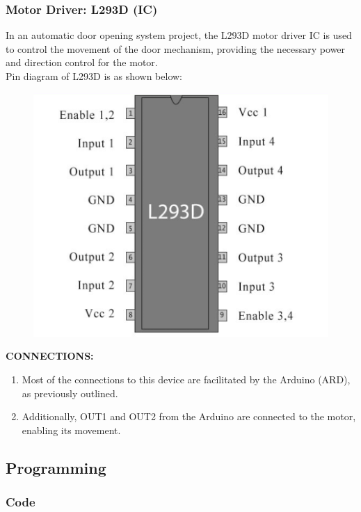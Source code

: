 \documentclass{article}
\begin{document}
\subsubsection{Motor Driver: L293D (IC)}
In an automatic door opening system project, the L293D motor driver IC is used to control the movement of the door mechanism, providing the necessary power and direction control for the motor.  \\
Pin diagram of L293D is as shown below:
\begin{figure}[H]
\centering
\includegraphics[scale = 0.5]{./figs/icpindia.png}
\end{figure}
\textbf{CONNECTIONS:}
\begin{enumerate}
\item Most of the connections to this device are facilitated by the Arduino (ARD), as previously outlined.
\item Additionally, OUT1 and OUT2 from the Arduino are connected to the motor, enabling its movement.
\end{enumerate}

\subsection{Programming}
\subsubsection{Code}

\end{document}
